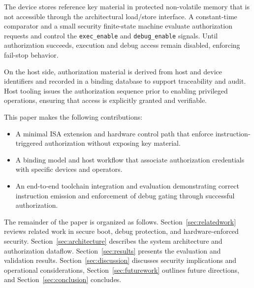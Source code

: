 \documentclass[conference]{IEEEtran}
\begin{document}
The device stores reference key material in protected non-volatile memory that is not
accessible through the architectural load/store interface. A constant-time comparator
and a small security finite-state machine evaluate authorization requests and control
the \texttt{exec\_enable} and \texttt{debug\_enable} signals. Until authorization
succeeds, execution and debug access remain disabled, enforcing fail-stop behavior.

On the host side, authorization material is derived from host and device identifiers
and recorded in a binding database to support traceability and audit. Host tooling
issues the authorization sequence prior to enabling privileged operations, ensuring
that access is explicitly granted and verifiable.

This paper makes the following contributions:
\begin{itemize}
  \item A minimal ISA extension and hardware control path that enforce instruction-triggered authorization without exposing key material.
  \item A binding model and host workflow that associate authorization credentials with specific devices and operators.
  \item An end-to-end toolchain integration and evaluation demonstrating correct instruction emission and enforcement of debug gating through successful authorization.
\end{itemize}

The remainder of the paper is organized as follows. Section~\ref{sec:relatedwork}
reviews related work in secure boot, debug protection, and hardware-enforced security.
Section~\ref{sec:architecture} describes the system architecture and authorization
dataflow. Section~\ref{sec:results} presents the evaluation and validation results.
Section~\ref{sec:discussion} discusses security implications and operational
considerations, Section~\ref{sec:futurework} outlines future directions, and
Section~\ref{sec:conclusion} concludes.















\end{document}
